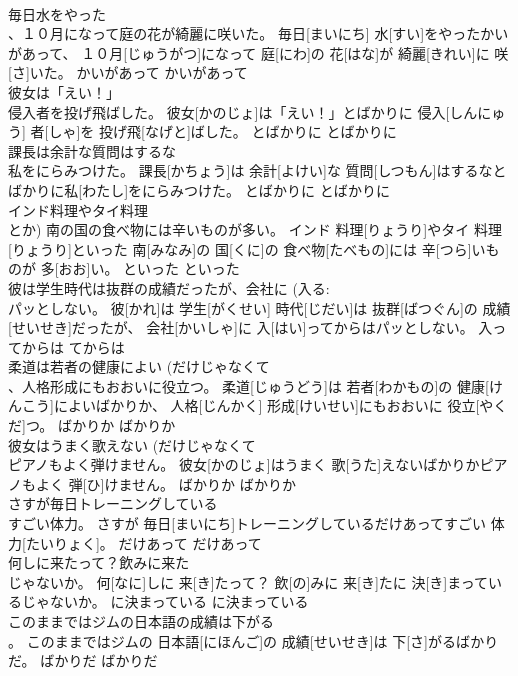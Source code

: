 \documentclass[8pt]{extreport}
\begin{document}
\begin{CJK}{UTF8}{min}
\\	毎日水をやった 
\\	、１０月になって庭の花が綺麗に咲いた。	毎日[まいにち] 水[すい]をやったかいがあって、 １０月[じゅうがつ]になって 庭[にわ]の 花[はな]が 綺麗[きれい]に 咲[さ]いた。	かいがあって	かいがあって~	
\\	彼女は「えい！」
\\	侵入者を投げ飛ばした。	彼女[かのじょ]は「えい！」とばかりに 侵入[しんにゅう] 者[しゃ]を 投げ飛[なげと]ばした。	とばかりに	とばかりに	
\\	課長は余計な質問はするな 
\\	私をにらみつけた。	課長[かちょう]は 余計[よけい]な 質問[しつもん]はするなとばかりに私[わたし]をにらみつけた。	とばかりに	とばかりに	
\\	インド料理やタイ料理 
\\	とか) 南の国の食べ物には辛いものが多い。	インド 料理[りょうり]やタイ 料理[りょうり]といった 南[みなみ]の 国[くに]の 食べ物[たべもの]には 辛[つら]いものが 多[おお]い。	といった	といった	
\\	彼は学生時代は抜群の成績だったが、会社に (入る: 
\\	パッとしない。	彼[かれ]は 学生[がくせい] 時代[じだい]は 抜群[ばつぐん]の 成績[せいせき]だったが、 会社[かいしゃ]に 入[はい]ってからはパッとしない。	入ってからは	てからは	
\\	柔道は若者の健康によい (だけじゃなくて 
\\	、人格形成にもおおいに役立つ。	柔道[じゅうどう]は 若者[わかもの]の 健康[けんこう]によいばかりか、 人格[じんかく] 形成[けいせい]にもおおいに 役立[やくだ]つ。	ばかりか	ばかりか	
\\	彼女はうまく歌えない (だけじゃなくて 
\\	ピアノもよく弾けません。	彼女[かのじょ]はうまく 歌[うた]えないばかりかピアノもよく 弾[ひ]けません。	ばかりか	ばかりか	
\\	さすが毎日トレーニングしている 
\\	すごい体力。	さすが 毎日[まいにち]トレーニングしているだけあってすごい 体力[たいりょく]。	だけあって	だけあって	
\\	何しに来たって？飲みに来た 
\\	じゃないか。	何[なに]しに 来[き]たって？ 飲[の]みに 来[き]たに 決[き]まっているじゃないか。	に決まっている	に決まっている	
\\	このままではジムの日本語の成績は下がる 
\\	。	このままではジムの 日本語[にほんご]の 成績[せいせき]は 下[さ]がるばかりだ。	ばかりだ	ばかりだ	

\end{CJK}
\end{document}
